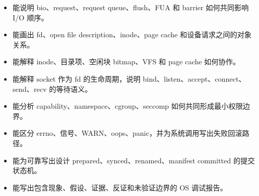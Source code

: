 \begin{rubricbox}
\begin{itemize}
\item 能说明 bio、request、request queue、flush、FUA 和 barrier 如何共同影响 I/O 顺序。
\item 能画出 fd、open file description、inode、page cache 和设备请求之间的对象关系。
\item 能解释 inode、目录项、空闲块 bitmap、VFS 和 page cache 如何协作。
\item 能解释 socket 作为 fd 的生命周期，说明 bind、listen、accept、connect、send、recv 的等待语义。
\item 能分析 capability、namespace、cgroup、seccomp 如何共同形成最小权限边界。
\item 能区分 errno、信号、WARN、oops、panic，并为系统调用写出失败回滚路径。
\item 能为可靠写出设计 prepared、synced、renamed、manifest committed 的提交状态机。
\item 能写出包含现象、假设、证据、反证和未验证边界的 OS 调试报告。
\end{itemize}
\end{rubricbox}
